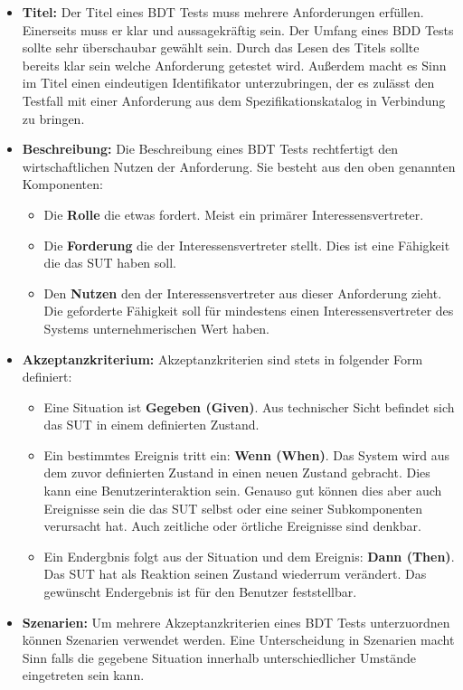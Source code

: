 \begin{itemize}
\item \textbf{Titel:} Der Titel eines \Gls{BDT} Tests muss mehrere Anforderungen erfüllen. Einerseits muss er klar und aussagekräftig sein. Der Umfang eines BDD Tests sollte sehr überschaubar gewählt sein. Durch das Lesen des Titels sollte bereits klar sein welche Anforderung getestet wird. Außerdem macht es Sinn im Titel einen eindeutigen Identifikator unterzubringen, der es zulässt den Testfall mit einer Anforderung aus dem Spezifikationskatalog in Verbindung zu bringen.
\item \textbf{Beschreibung:} Die Beschreibung eines \Gls{BDT} Tests rechtfertigt den wirtschaftlichen Nutzen der Anforderung. Sie besteht aus den oben genannten Komponenten:

\begin{itemize}
\item Die \textbf{Rolle} die etwas fordert. Meist ein primärer Interessensvertreter.
\item Die \textbf{Forderung} die der Interessensvertreter stellt. Dies ist eine Fähigkeit die das \Gls{SUT} haben soll.
\item Den \textbf{Nutzen} den der Interessensvertreter aus dieser Anforderung zieht. Die geforderte Fähigkeit soll für mindestens einen Interessensvertreter des Systems unternehmerischen Wert haben.
\end{itemize}

\item \textbf{Akzeptanzkriterium:} Akzeptanzkriterien sind stets in folgender Form definiert:
\begin{itemize}
\item Eine Situation ist \textbf{Gegeben (Given)}. Aus technischer Sicht befindet sich das \Gls{SUT} in einem definierten Zustand.
\item Ein bestimmtes Ereignis tritt ein: \textbf{Wenn (When)}. Das System wird aus dem zuvor definierten Zustand in einen neuen Zustand gebracht. Dies kann eine Benutzerinteraktion sein. Genauso gut können dies aber auch Ereignisse sein die das \Gls{SUT} selbst oder eine seiner Subkomponenten verursacht hat. Auch zeitliche oder örtliche Ereignisse sind denkbar.
\item Ein Endergbnis folgt aus der Situation und dem Ereignis: \textbf{Dann (Then)}. Das \Gls{SUT} hat als Reaktion seinen Zustand wiederrum verändert. Das gewünscht Endergebnis ist für den Benutzer feststellbar.
\end{itemize}

\item \textbf{Szenarien:} Um mehrere Akzeptanzkriterien eines \Gls{BDT} Tests unterzuordnen können Szenarien verwendet werden. Eine Unterscheidung in Szenarien macht Sinn falls die gegebene Situation innerhalb unterschiedlicher Umstände eingetreten sein kann.
\end{itemize}

